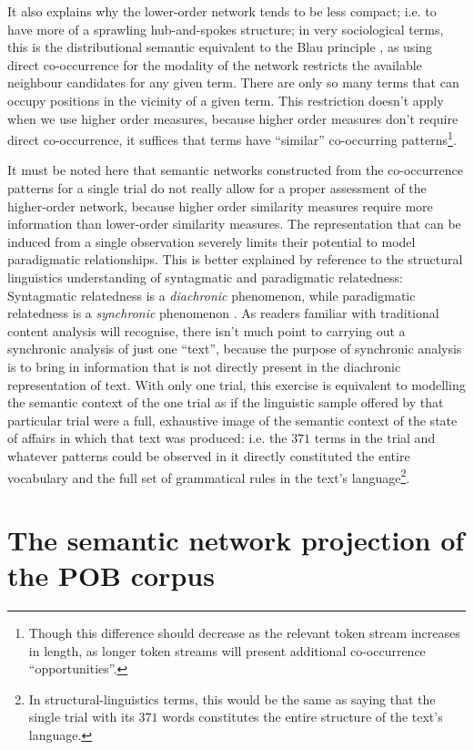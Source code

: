 It also explains why the lower-order network tends to be less compact; i.e. to have more of a sprawling hub-and-spokes structure; in very sociological terms, this is the distributional semantic equivalent to the Blau principle \citep[p. 71]{blau1987}, as using direct co-occurrence for the modality of the network restricts the available neighbour candidates for any given term.
There are only so many terms that can occupy positions in the vicinity of a given term.
This restriction doesn't apply when we use higher order measures, because higher order measures don't require direct co-occurrence, it suffices that terms have ``similar'' co-occurring patterns\footnote{
    Though this difference should decrease as the relevant token stream increases in length, as longer token streams will present additional co-occurrence ``opportunities''.
}.

It must be noted here that semantic networks constructed from the co-occurrence patterns for a single trial do not really allow for a proper assessment of the higher-order network, because higher order similarity measures require more information than lower-order similarity measures.
The representation that can be induced from a single observation severely limits their potential to model paradigmatic relationships.
This is better explained by reference to the structural linguistics understanding of syntagmatic and paradigmatic relatedness:
Syntagmatic relatedness is a \emph{diachronic} phenomenon, while paradigmatic relatedness is a \emph{synchronic} phenomenon \citep{desaussure2011}.
As readers familiar with traditional content analysis will recognise, there isn't much point to carrying out a synchronic analysis of just one ``text'', because the purpose of synchronic analysis is to bring in information that is not directly present in the diachronic representation of text.
With only one trial, this exercise is equivalent to modelling the semantic context of the one trial as if the linguistic sample offered by that particular trial were a full, exhaustive image of the semantic context of the state of affairs in which that text was produced: i.e. the $371$ terms in the trial and whatever patterns could be observed in it directly constituted the entire vocabulary and the full set of grammatical rules in the text's language\footnote{
    In structural-linguistics terms, this would be the same as saying that the single trial with its $371$ words constitutes the entire structure of the text's language.
}.

\section{The semantic network projection of the POB corpus}
\label{sec:global_net}

